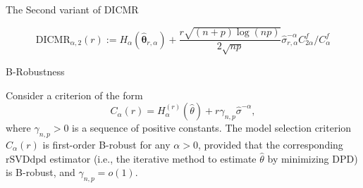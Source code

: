 \documentclass{beamer}
\newcommand{\bb}[1]{\boldsymbol{#1}}
\newcommand{\bbhat}[1]{\hat{\boldsymbol{#1}}}
\begin{document}
\begin{frame}{The Second variant of DICMR}
\begin{center}
    \end{center}

    \pause
    \begin{equation*}
        \text{DICMR}_{\alpha,2}(r) := H_{\alpha}(\bbhat{\theta}_{r,\alpha}) + \dfrac{r \sqrt{(n+p) \log(np)}}{2\sqrt{np}} \widehat{\sigma}_{r,\alpha}^{-\alpha} C^f_{2\alpha}/C^f_{\alpha}
    \end{equation*}
\end{frame}


\begin{frame}{B-Robustness}
    \begin{theorem}
        Consider a criterion of the form
        \begin{equation*}
            C_\alpha(r) = H_\alpha^{(r)}(\hat{\theta}) + r \gamma_{n,p} \widehat{\sigma}^{-\alpha},
        \end{equation*}
        \noindent where $\gamma_{n,p} > 0$ is a sequence of positive constants. The model selection criterion $C_\alpha(r)$ is first-order B-robust for any $\alpha > 0$, provided that the corresponding $\mathrm{rSVDdpd}$ estimator (i.e., the iterative method to estimate $\hat{\theta}$ by minimizing DPD) is B-robust, and $\gamma_{n,p} = o(1)$.
    \end{theorem}
\end{frame}





\end{document}
